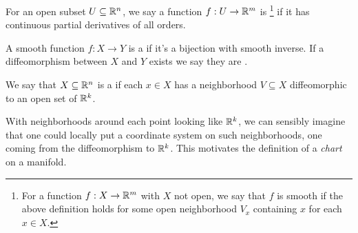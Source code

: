 \documentclass[a4paper]{scrartcl}
\begin{document}
\begin{definition}[Smooth]
    For an open subset $U \subseteq \mathbb{R}^n$, we say a function $f: U \rightarrow \mathbb{R}^m$ is \footnote{For a function $f: X \rightarrow \mathbb{R}^m$ with $X$ not open, we say that $f$ is smooth if the above definition holds for some open neighborhood $V_x$ containing $x$ for each $x \in X$.} if it has continuous partial derivatives of all orders. 
\end{definition}

\begin{definition}[Diffeomorphism]
    A smooth function $f: X \rightarrow Y$ is a  if it's a bijection with smooth inverse. If a diffeomorphism between $X$ and $Y$ exists we say they are .
\end{definition}

\begin{definition}[Manifold]
    We say that $X \subseteq \mathbb{R}^n$ is a  if each $x \in X$ has a neighborhood $V \subseteq X$ diffeomorphic to an open set of $\mathbb{R}^k$. 
\end{definition}

With neighborhoods around each point looking like $\mathbb{R}^k$, we can sensibly imagine that one could locally put a coordinate system on such neighborhoods, one coming from the diffeomorphism to $\mathbb{R}^k$. This motivates the definition of a \emph{chart} on a manifold.
\end{document}
